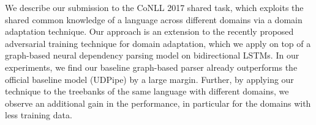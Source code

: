 We describe our submission to the CoNLL 2017 shared task, which exploits the shared common knowledge of a language across different domains via a domain adaptation technique. Our approach is an extension to the recently proposed adversarial training technique for domain adaptation, which we apply on top of a graph-based neural dependency parsing model on bidirectional LSTMs. In our experiments, we find our baseline graph-based parser already outperforms the official baseline model (UDPipe) by a large margin. Further, by applying our technique to the treebanks of the same language with different domains, we observe an additional gain in the performance, in particular for the domains with less training data.
